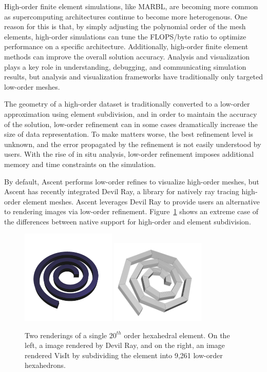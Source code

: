 High-order finite element simulations, like MARBL, are becoming more
common as supercomputing architectures continue to become more
heterogenous.
%
One reason for this is that, by simply adjusting the polynomial order
of the mesh elements, high-order simulations
can tune the FLOPS/byte ratio to optimize performance on a specific architecture.
%
Additionally, high-order finite element methods can improve the overall solution accuracy.
%
Analysis and visualization plays a key role in understanding, debugging,
and communicating simulation results, but analysis and visualization frameworks
have traditionally only targeted low-order meshes.
%

The geometry of a high-order dataset is traditionally converted
to a low-order approximation using element subdivision, and in order
to maintain the accuracy of the solution, low-order refinement can
in some cases dramatically increase the size of data representation.
%
To make matters worse, the best refinement level is unknown,
and the error propagated by the refinement is not easily understood by users.
%
With the rise of in situ analysis, low-order refinement imposes additional memory
and time constraints on the simulation.
%

By default, Ascent performs low-order refines to visualize high-order meshes,
but Ascent has recently integrated Devil Ray, a library for natively ray tracing
high-order element meshes.
%
Ascent leverages Devil Ray to provide users an alternative to rendering images via low-order refinement.
%
Figure~\ref{img:crazy_hex} shows an extreme case of the differences between native support for high-order and element subdivision.

\begin{figure}
\centering
\includegraphics[width=0.4\textwidth]{images/dray_crazy}
\includegraphics[width=0.4\textwidth]{images/visit_crazy}
\caption{\label{img:crazy_hex} Two renderings of a single $20^{th}$ order hexahedral element.
On the left, a image rendered by Devil Ray, and on the right, an image rendered VisIt by subdividing the element into
9,261 low-order hexahedrons.}
\end{figure}
